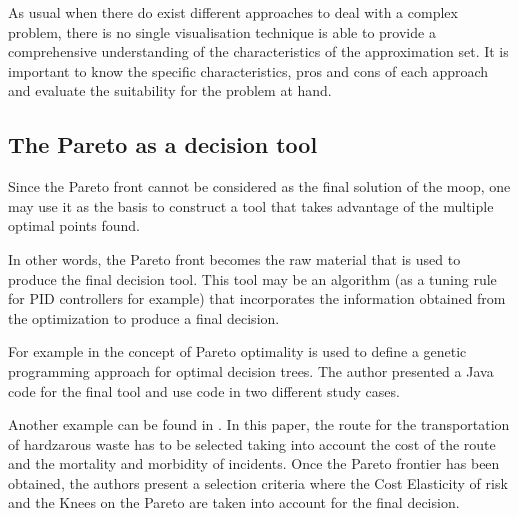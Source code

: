 As usual when there do exist different approaches to deal with a complex problem, there is  no single visualisation technique is able to provide a comprehensive understanding of the characteristics of the approximation set. It is important to know the specific characteristics, pros and cons of each approach and evaluate the suitability for the problem at hand.
  
\subsection{The Pareto as a decision tool}
\label{sec:ParetoData}
%
Since the Pareto front cannot be considered as the final solution of the \gls{moop}, one may use it as the basis to construct a tool that takes advantage of the multiple optimal points found.

In other words, the Pareto front becomes the raw material that is used to produce the final decision tool. This tool may be an algorithm (as a tuning rule for PID controllers for example) that incorporates the information obtained from the optimization to produce a final decision.

For example in \cite{Zhao2007}	the concept of Pareto optimality is used to define a genetic programming approach for optimal decision trees. The author presented a Java code for the final tool and use code in two different study cases.

Another example can be found in \cite{Das2012}. In this paper, the route for the transportation of hardzarous waste has to be selected taking into account the cost of the route and the mortality and morbidity of incidents. Once the Pareto frontier has been obtained, the authors present a selection criteria where the Cost Elasticity of risk and the Knees on the Pareto are taken into account for the final decision.
%
%

